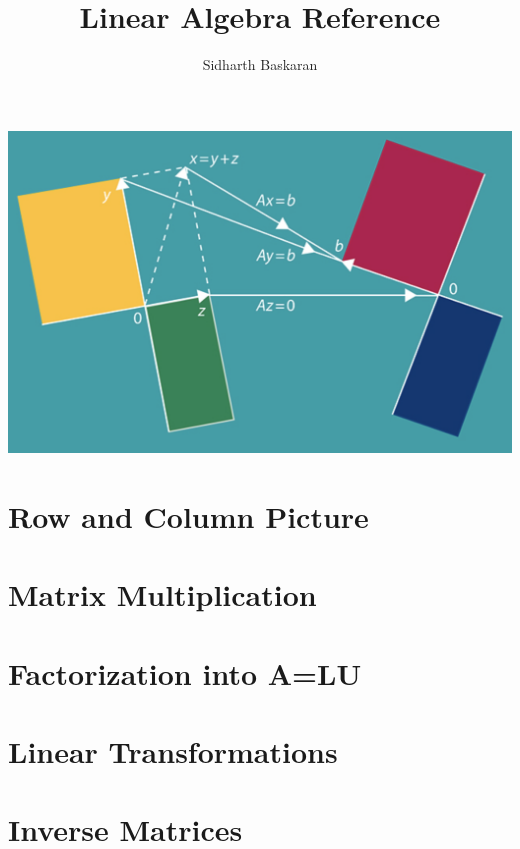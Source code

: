 \documentclass[11pt]{article}
\title{Linear Algebra Reference}
\author{Sidharth Baskaran}
\begin{document}
\maketitle

\begin{center}
    \includegraphics[scale=0.3]{cover.png}
\end{center}

\tableofcontents
\newpage

\section{Row and Column Picture}


\section{Matrix Multiplication}


\section{Factorization into A=LU}


\section{Linear Transformations}


\section{Inverse Matrices}

\end{document}
